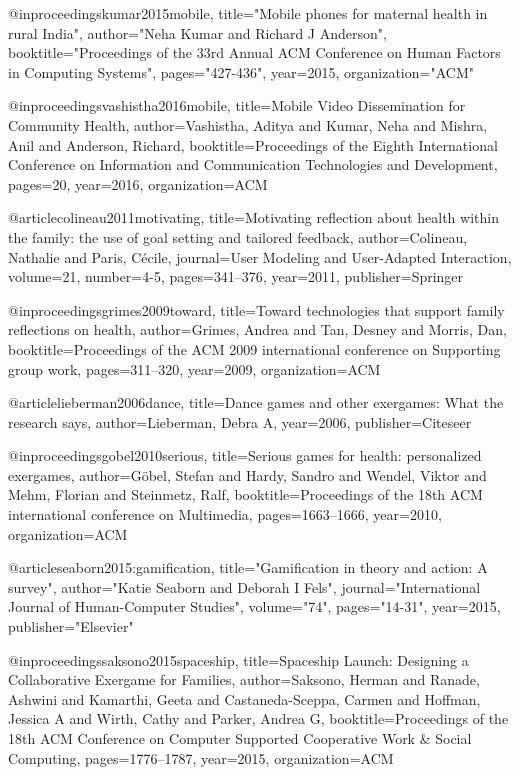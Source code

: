 @inproceedings{kumar2015mobile,
  title="Mobile phones for maternal health in rural India",
  author="Neha Kumar and Richard J Anderson",
  booktitle="Proceedings of the 33rd Annual ACM Conference on Human Factors in Computing Systems",
  pages="427-436",
  year={2015},
  organization="ACM"
}

@inproceedings{vashistha2016mobile,
  title={Mobile Video Dissemination for Community Health},
  author={Vashistha, Aditya and Kumar, Neha and Mishra, Anil and Anderson, Richard},
  booktitle={Proceedings of the Eighth International Conference on Information and Communication Technologies and Development},
  pages={20},
  year={2016},
  organization={ACM}
}

@article{colineau2011motivating,
  title={Motivating reflection about health within the family: the use of goal setting and tailored feedback},
  author={Colineau, Nathalie and Paris, C{\'e}cile},
  journal={User Modeling and User-Adapted Interaction},
  volume={21},
  number={4-5},
  pages={341--376},
  year={2011},
  publisher={Springer}
}

@inproceedings{grimes2009toward,
  title={Toward technologies that support family reflections on health},
  author={Grimes, Andrea and Tan, Desney and Morris, Dan},
  booktitle={Proceedings of the ACM 2009 international conference on Supporting group work},
  pages={311--320},
  year={2009},
  organization={ACM}
}


@article{lieberman2006dance,
  title={Dance games and other exergames: What the research says},
  author={Lieberman, Debra A},
  year={2006},
  publisher={Citeseer}
}

@inproceedings{gobel2010serious,
  title={Serious games for health: personalized exergames},
  author={G{\"o}bel, Stefan and Hardy, Sandro and Wendel, Viktor and Mehm, Florian and Steinmetz, Ralf},
  booktitle={Proceedings of the 18th ACM international conference on Multimedia},
  pages={1663--1666},
  year={2010},
  organization={ACM}
}

@article{seaborn2015:gamification,
  title="Gamification in theory and action: A survey",
  author="Katie Seaborn and Deborah I Fels",
  journal="International Journal of Human-Computer Studies",
  volume="74",
  pages="14-31",
  year={2015},
  publisher="Elsevier"
}

@inproceedings{saksono2015spaceship,
  title={Spaceship Launch: Designing a Collaborative Exergame for Families},
  author={Saksono, Herman and Ranade, Ashwini and Kamarthi, Geeta and Castaneda-Sceppa, Carmen and Hoffman, Jessica A and Wirth, Cathy and Parker, Andrea G},
  booktitle={Proceedings of the 18th ACM Conference on Computer Supported Cooperative Work \& Social Computing},
  pages={1776--1787},
  year={2015},
  organization={ACM}
}


